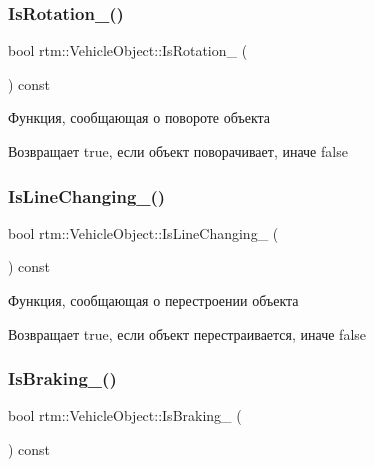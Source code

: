 \subsubsection{\texorpdfstring{Is\+Rotation\+\_\+()}{IsRotation\_()}}
{\footnotesize\ttfamily bool rtm\+::\+Vehicle\+Object\+::\+Is\+Rotation\+\_\+ (\begin{DoxyParamCaption}{ }\end{DoxyParamCaption}) const\hspace{0.3cm}{\ttfamily [protected]}}

Функция, сообщающая о повороте объекта \begin{DoxyReturn}{Возвращает}
true, если объект поворачивает, иначе false 
\end{DoxyReturn}
\mbox{\label{classrtm_1_1_vehicle_object_a464c8de22beb3cbf819d12ad36ae4974}} 
\subsubsection{\texorpdfstring{Is\+Line\+Changing\+\_\+()}{IsLineChanging\_()}}
{\footnotesize\ttfamily bool rtm\+::\+Vehicle\+Object\+::\+Is\+Line\+Changing\+\_\+ (\begin{DoxyParamCaption}{ }\end{DoxyParamCaption}) const\hspace{0.3cm}{\ttfamily [protected]}}

Функция, сообщающая о перестроении объекта \begin{DoxyReturn}{Возвращает}
true, если объект перестраивается, иначе false 
\end{DoxyReturn}
\mbox{\label{classrtm_1_1_vehicle_object_ab74eb10fd7df8238a437923cbf184bca}} 
\subsubsection{\texorpdfstring{Is\+Braking\+\_\+()}{IsBraking\_()}}
{\footnotesize\ttfamily bool rtm\+::\+Vehicle\+Object\+::\+Is\+Braking\+\_\+ (\begin{DoxyParamCaption}{ }\end{DoxyParamCaption}) const\hspace{0.3cm}{\ttfamily [protected]}}

